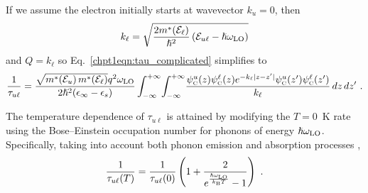 {\begin{equation}
\end{equation}
If we assume the electron initially starts at wavevector $k_u=0$, then
\begin{equation}
k_\ell = \sqrt{\frac{2 m^*\!\left(\EE_\ell\right)}{\hslash^2} \left(\EE_{u\ell}-\hslash\omega_{\tn{LO}}\right)}
\end{equation}
and $Q=k_\ell$ so Eq.~\eqref{chpt1eqn:tau_complicated} simplifies to
\begin{equation}
\frac{1}{\tau_{u\ell}} = \frac{\sqrt{m^*\!\left(\EE_u\right) m^*\!\left(\EE_\ell\right)} q^2 \omega_{\tn{LO}}}{2 \hslash^2 (\epsilon_\infty - \epsilon_s)} \int_{-\infty}^{+\infty} \! \int_{-\infty}^{+\infty} \!  \frac{\psi_\tn{\tiny{C}}^u(z) \psi_\tn{\tiny{C}}^\ell (z) e^{-k_\ell|z-z'|} \psi_\tn{\tiny{C}}^u(z') \psi_\tn{\tiny{C}}^\ell (z')}{k_\ell}  \, dz \, dz' \tn{~.}
\end{equation}

The temperature dependence of $\tau_{u\ell}$ is attained by modifying the $T=0$~K rate using the Bose--Einstein occupation number for phonons of energy $\hslash\omega_{\textnormal{LO}}$.  Specifically, taking into account both phonon emission and absorption processes \cite{Ferreira:PRB:1989},
\begin{equation}
\frac{1}{\tau_{u\ell}(T)} = \frac{1}{\tau_{u\ell}(0)}  \left(1 + \frac{2}{e^{\frac{\hslash\omega_{\textnormal{LO}}}{k_{\textnormal{B}} T}}-1} \right) \textnormal{~.}
\end{equation}




%
%


}
